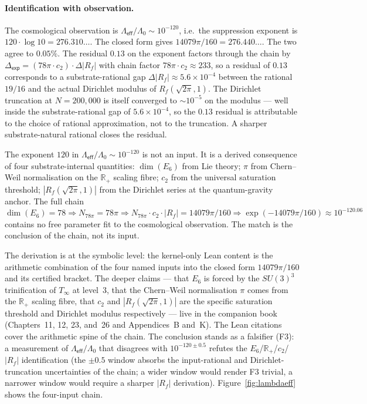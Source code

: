 \documentclass[11pt,a4paper]{amsart}
\theoremstyle{plain}
\theoremstyle{definition}
\begin{document}
\paragraph{Identification with observation.} The cosmological observation is $\Lambda_{\textsf{eff}}/\Lambda_0 \sim 10^{-120}$, i.e.\ the suppression exponent is $120 \cdot \log 10 = 276.310\ldots$. The closed form gives $14079\pi/160 = 276.440\ldots$. The two agree to $0.05\%$. The residual $0.13$ on the exponent factors through the chain by $\Delta_{\textsf{exp}} = (78\pi\cdot c_2)\cdot \Delta|R_f|$ with chain factor $78\pi\cdot c_2 \approx 233$, so a residual of $0.13$ corresponds to a substrate-rational gap $\Delta|R_f| \approx 5.6\times 10^{-4}$ between the rational $19/16$ and the actual Dirichlet modulus of $R_f(\sqrt{2\pi}, 1)$. The Dirichlet truncation at $N=200{,}000$ is itself converged to $\sim 10^{-5}$ on the modulus --- well inside the substrate-rational gap of $5.6\times 10^{-4}$, so the $0.13$ residual is attributable to the choice of rational approximation, not to the truncation. A sharper substrate-natural rational closes the residual.

The exponent $120$ in $\Lambda_{\textsf{eff}}/\Lambda_0 \sim 10^{-120}$ is not an input. It is a derived consequence of four substrate-internal quantities: $\dim(E_6)$ from Lie theory; $\pi$ from Chern--Weil normalisation on the $\mathbb{R}_+$ scaling fibre; $c_2$ from the universal saturation threshold; $|R_f(\sqrt{2\pi}, 1)|$ from the Dirichlet series at the quantum-gravity anchor. The full chain $\dim(E_6) = 78 \Rightarrow N_{78\pi} = 78\pi \Rightarrow N_{78\pi} \cdot c_2 \cdot |R_f| = 14079\pi/160 \Rightarrow \exp(-14079\pi/160) \approx 10^{-120.06}$ contains no free parameter fit to the cosmological observation. The match is the conclusion of the chain, not its input.

The derivation is at the symbolic level: the kernel-only Lean content is the arithmetic combination of the four named inputs into the closed form $14079\pi/160$ and its certified bracket. The deeper claims --- that $E_6$ is forced by the $SU(3)^3$ trinification of $T_\infty$ at level~3, that the Chern--Weil normalisation $\pi$ comes from the $\mathbb{R}_+$ scaling fibre, that $c_2$ and $|R_f(\sqrt{2\pi}, 1)|$ are the specific saturation threshold and Dirichlet modulus respectively --- live in the companion book (Chapters~11, 12, 23, and~26 and Appendices~B and~K). The Lean citations cover the arithmetic spine of the chain. The conclusion stands as a falsifier (F3): a measurement of $\Lambda_{\textsf{eff}}/\Lambda_0$ that disagrees with $10^{-120 \pm 0.5}$ refutes the $E_6$/$\mathbb{R}_+$/$c_2$/$|R_f|$ identification (the $\pm 0.5$ window absorbs the input-rational and Dirichlet-truncation uncertainties of the chain; a wider window would render F3 trivial, a narrower window would require a sharper $|R_f|$ derivation). Figure~\ref{fig:lambdaeff} shows the four-input chain.
\end{document}
